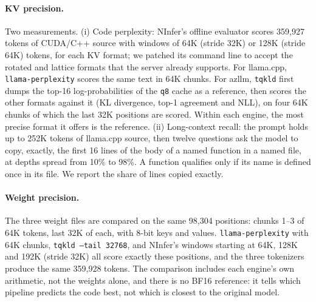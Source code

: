 \paragraph{KV precision.}
Two measurements. (i) Code perplexity: NInfer's offline evaluator scores 359{,}927 tokens of
CUDA/C++ source with windows of 64K (stride 32K) or 128K (stride 64K) tokens, for each KV format;
we patched its command line to accept the rotated and lattice formats that the server already
supports. For llama.cpp, \texttt{llama-perplexity} scores the same text in 64K chunks. For
azllm, \texttt{tqkld} first dumps the top-16 log-probabilities of the \texttt{q8} cache as a
reference, then scores the other formats against it (KL divergence, top-1 agreement and NLL),
on four 64K chunks of which the last 32K positions are scored. Within each engine, the most
precise format it offers is the reference. (ii) Long-context recall: the prompt holds up to 252K tokens of
llama.cpp source, then twelve questions ask the model to copy, exactly, the first 16 lines of
the body of a named function in a named file, at depths spread from 10\% to 98\%. A function
qualifies only if its name is defined once in its file. We report the share of lines copied
exactly.

\paragraph{Weight precision.}
The three weight files are compared on the same 98{,}304 positions: chunks 1--3 of 64K tokens,
last 32K of each, with 8-bit keys and values. \texttt{llama-perplexity} with 64K chunks,
\texttt{tqkld --tail 32768}, and NInfer's windows starting at 64K, 128K and 192K (stride 32K)
all score exactly these positions, and the three tokenizers produce the same 359{,}928 tokens. The
comparison includes each engine's own arithmetic, not the weights alone, and there is no BF16
reference: it tells which pipeline predicts the code best, not which is closest to the original
model.
